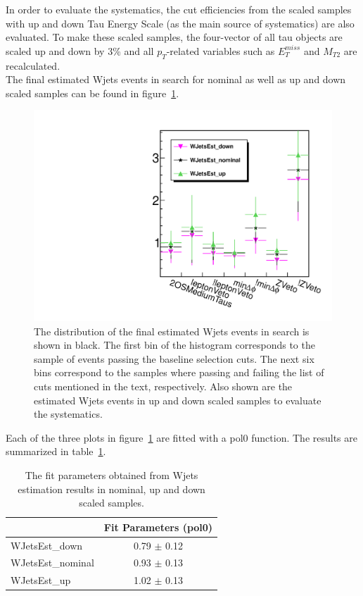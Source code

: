 In order to evaluate the systematics, the cut efficiencies from the scaled samples with 
up and down Tau Energy Scale (as the main source of systematics) are also evaluated.
To make these scaled samples, the four-vector of all tau objects 
are scaled up and down by 3\% and all $p_T$-related variables such as $E_T^{miss}$ 
and $M_{T2}$ are recalculated.\\
The final estimated Wjets events in search \binone for nominal as well as up and down scaled samples 
can be found in figure~\ref{fig:wjets_1}.  
\begin{figure}[iHhtb]
\centering
\includegraphics[angle=0,scale=0.35]{TauTauFigs/WJets_bin1.pdf}
\caption{The distribution of the final estimated Wjets events in search \binone is shown in black. 
 The first bin of the histogram corresponds to the sample of events passing the baseline selection cuts. 
The next six bins correspond to the samples where passing and failing the 
list of cuts mentioned in the text, respectively. Also shown are the estimated Wjets events in up and down scaled samples to evaluate the systematics.}
\label{fig:wjets_1}
\end{figure}

Each of the three plots in figure~\ref{fig:wjets_1} are fitted with a pol0 function. The results are summarized in table~\ref{tbl:fitpars}.
\begin{table}
\begin{center}
\begin{tabular}{lc}
\hline\hline
  & Fit Parameters (pol0) \\
\hline\hline
WJetsEst\_down & 0.79 $\pm$ 0.12 \\
WJetsEst\_nominal & 0.93 $\pm$ 0.13 \\
WJetsEst\_up & 1.02 $\pm$ 0.13 \\
\hline\hline
\end{tabular}
\caption{The fit parameters obtained from Wjets estimation results in nominal, up and down scaled samples.}
\label{tbl:fitpars}
\end{center}
\end{table}

